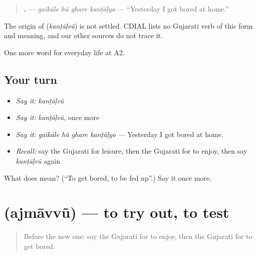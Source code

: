 \begin{quote}
\textbf{   .} — \emph{gaīkāle hũ ghare kanṭāḷyo} — \textquotedblleft{}Yesterday I got bored at home.\textquotedblright{}
\end{quote}

\begin{cousinweb}
The origin of \textbf{} (\emph{kanṭāḷvũ}) is not settled. CDIAL lists no Gujarati verb of this form and meaning, and our other sources do not trace it.
\end{cousinweb}

\begin{grammarlens}[title={What you've built}]
One more word for everyday life at A2.
\end{grammarlens}

\subsection*{Your turn}
\begin{itemize}
\raggedright
  \item \emph{Say it:} \emph{kanṭāḷvũ}
  \item \emph{Say it:} \emph{kanṭāḷvũ}, once more
  \item \emph{Say it:} \emph{gaīkāle hũ ghare kanṭāḷyo} — Yesterday I got bored at home.
  \item \emph{Recall:} say the Gujarati for leisure, then the Gujarati for to enjoy, then say \emph{kanṭāḷvũ} again
\end{itemize}

\begin{tcolorbox}[breakable,colback=teal!4,colframe=teal!35!black,title={Before you move on}]
What does  mean? (\textquotedblleft{}To get bored, to be fed up\textquotedblright{}.) Say it once more.
\end{tcolorbox}
\section[\texorpdfstring{\gu{અજમાવવું} (ajmāvvũ)}{અજમાવવું (ajmāvvũ)}]{ (ajmāvvũ) — to try out, to test}

\label{lesson:GU-C253-ajmavvu}



\begin{quote}
Before the new one: say the Gujarati for to enjoy, then the Gujarati for to get bored.
\end{quote}

